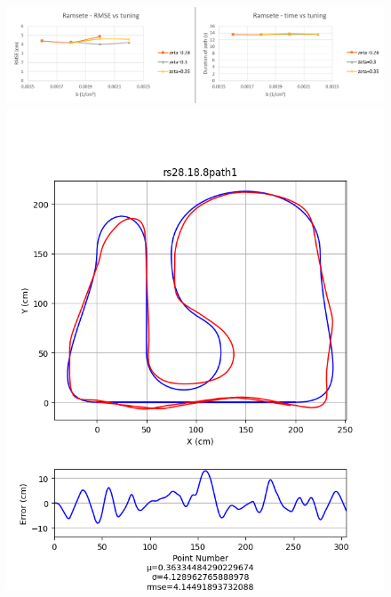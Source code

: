 \documentclass[mla8alt]{mla}
\begin{document}
\begin{paper}
\begin{figure}[H]
\includegraphics[width=\linewidth]{tuningGraphs/rs}
\includegraphics[width=\linewidth]{pathData/rspath1}
\endminipage\hfill
{}

\end{figure}
\end{paper}
\end{document}
